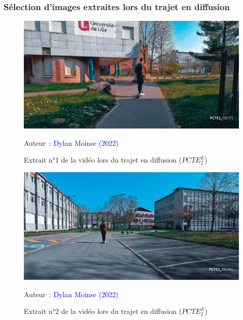 \subsubsection{Sélection d'images extraites lors du trajet en diffusion}

    \begin{figure}[h!]\vspace*{4pt}
        \caption*{Extrait n°1 de la vidéo lors du trajet en diffusion (\(PCTE^{E}_{2}\))}
        \centerline{\includegraphics[width=0.75\columnwidth]{src/Figures/Annexes/Extrait_Video_PCTE2_Egress_1.jpg}}
        \vspace{5pt}
        \begin{flushright}\scriptsize{
        Auteur~: \textcolor{blue}{Dylan Moinse (2022)}
        }\end{flushright}
    \end{figure}

    \begin{figure}[h!]\vspace*{4pt}
        \caption*{Extrait n°2 de la vidéo lors du trajet en diffusion (\(PCTE^{E}_{2}\))}
        \centerline{\includegraphics[width=0.75\columnwidth]{src/Figures/Annexes/Extrait_Video_PCTE2_Egress_2.jpg}}
        \vspace{5pt}
        \begin{flushright}\scriptsize{
        Auteur~: \textcolor{blue}{Dylan Moinse (2022)}
        }\end{flushright}
    \end{figure}

